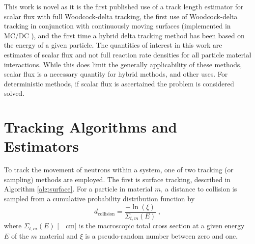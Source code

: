 This work is novel as it is the first published use of a track length estimator for scalar flux with full Woodcock-delta tracking, the first use of Woodcock-delta tracking in conjunction with continuously moving surfaces (implemented in MC/DC \cite{variansyah_2023_highfidelity}), and the first time a hybrid delta tracking method has been based on the energy of a given particle.
The quantities of interest in this work are estimates of scalar flux and not full reaction rate densities for all particle material interactions.
While this does limit the generally applicability of these methods, scalar flux is a necessary quantity for hybrid methods, and other uses.
For deterministic methods, if scalar flux is ascertained the problem is considered solved.


\section{Tracking Algorithms and Estimators}
\label{sec:tracking_algs_and_est}

To track the movement of neutrons within a system, one of two tracking (or sampling) methods are employed. 
The first is surface tracking, described in Algorithm \ref{alg:surface}. 
For a particle in material $m$, a distance to collision is sampled from a cumulative probability distribution function by
\begin{equation}
    d_{\text{collision}} = \frac{-\ln(\xi)}{\Sigma_{t,m}(E)} \; ,
\end{equation}
where $\Sigma_{t,m}(E)$ [\SI{}{\per\centi\meter}] is the macroscopic total cross section at a given energy $E$ of the $m$ material and $\xi$ is a pseudo-random number between zero and one.

